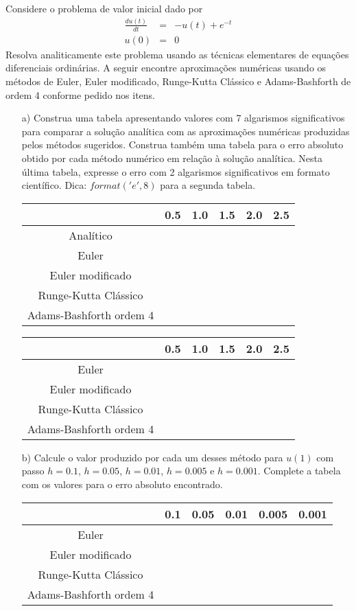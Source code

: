 \begin{exer} Considere o problema de valor inicial dado por
\begin{eqnarray*}
\frac{d u(t)}{dt} &=& -u(t) + e^{-t} \\
u(0)&=&0
\end{eqnarray*}
Resolva analiticamente este problema usando as técnicas elementares de equações diferenciais ordinárias. A seguir encontre aproximações numéricas usando os métodos de Euler, Euler modificado, Runge-Kutta Clássico e Adams-Bashforth de ordem 4 conforme pedido nos itens.
\begin{itemize}
\item[a)]  Construa uma tabela apresentando valores com 7 algarismos significativos para comparar a solução analítica com as aproximações numéricas produzidas pelos métodos sugeridos. Construa também uma tabela para o erro absoluto obtido por cada método numérico em relação à solução analítica. Nesta última tabela, expresse o erro com 2 algarismos significativos em formato científico. Dica: $format('e',8)$ para a segunda tabela.
\begin{center}
\begin{tabular}{|c|c|c|c|c|c|}
\hline
&0.5&1.0&1.5&2.0&2.5\\
\hline
Analítico&&&&&\\
\hline
Euler&&&&&\\
\hline
Euler modificado&&&&&\\
\hline
Runge-Kutta Clássico&&&&&\\
\hline
Adams-Bashforth ordem 4&&&&&\\
\hline
\end{tabular}
\end{center}

\begin{center}
\begin{tabular}{|c|c|c|c|c|c|}
\hline
&0.5&1.0&1.5&2.0&2.5\\
\hline
Euler&&&&&\\
\hline
Euler modificado&&&&&\\
\hline
Runge-Kutta Clássico&&&&&\\
\hline
Adams-Bashforth ordem 4&&&&&\\
\hline
\end{tabular}
\end{center}

\item[b)] Calcule o valor produzido por cada um desses método para $u(1)$ com passo $h=0.1$, $h=0.05$, $h=0.01$, $h=0.005$ e $h=0.001$. Complete a tabela com os valores para o erro absoluto encontrado.
\begin{center}
\begin{tabular}{|c|c|c|c|c|c|}
\hline
&0.1&0.05&0.01&0.005&0.001\\
\hline
Euler&&&&&\\
\hline
Euler modificado&&&&&   \\
\hline
Runge-Kutta Clássico&&&&&\\
\hline
Adams-Bashforth ordem 4&&&&&\\
\hline
\end{tabular}
\end{center}


\end{itemize}
\end{exer}
